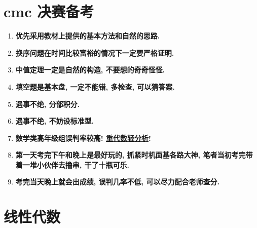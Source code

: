 \section{cmc 决赛备考}

\begin{enumerate}
	\item \textbf{优先采用教材上提供的基本方法和自然的思路.}
	\item \textbf{换序问题在时间比较富裕的情况下一定要严格证明.}
	\item \textbf{中值定理一定是自然的构造, 不要想的奇奇怪怪.}
	\item \textbf{填空题是基本盘, 一定不能错, 多检查, 可以猜答案.}
	\item \textbf{遇事不绝, 分部积分.}
	\item \textbf{遇事不绝, 不妨设标准型.}
	\item \textbf{数学类高年级组误判率较高! \underline{重代数轻分析}!}
	\item \textbf{第一天考完下午和晚上是最好玩的, 抓紧时机面基各路大神, 笔者当初考完带着一堆小伙伴去撸串, 干了十瓶可乐.}
	\item \textbf{考完当天晚上就会出成绩, 误判几率不低, 可以尽力配合老师查分.}
\end{enumerate}

\section{线性代数}

